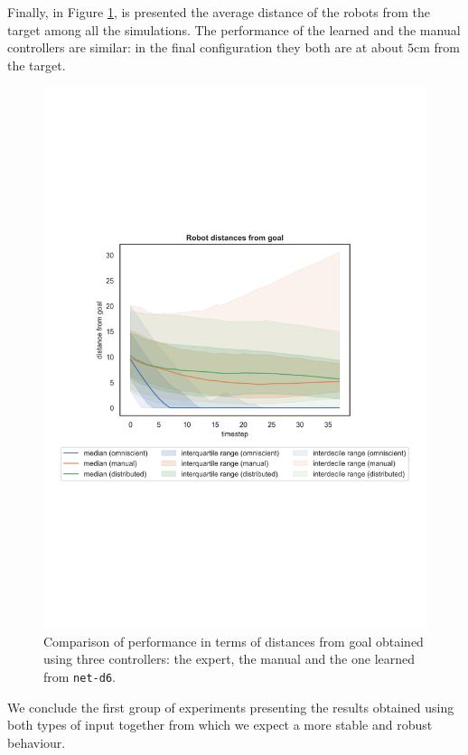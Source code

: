 \bigskip
Finally, in Figure \ref{fig:net-d6distance}, is presented the average distance of the 
robots from the target among all the simulations. The performance of the learned 
and the manual controllers are similar: in the final configuration they both are at 
about $5$cm from the target. 
\begin{figure}[!htb]
	\centering
	\includegraphics[width=.65\textwidth]{contents/images/net-d6/distances-from-goal-compressed-distributed}%
		\caption[Evaluation of \texttt{net-d6} distances from goal.]{Comparison of 
		performance in terms of distances from goal obtained using three 
		controllers: the expert, the manual and the one learned from \texttt{net-d6}.}
	\label{fig:net-d6distance}
\end{figure}

We conclude the first group of experiments presenting the results obtained 
using both types of input together from which we expect a more stable and 
robust behaviour. 

